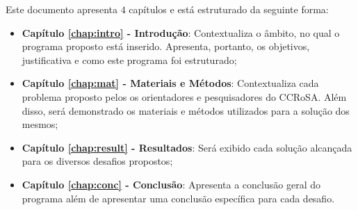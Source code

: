 Este documento apresenta $4$ capítulos e está estruturado da seguinte forma:

\begin{itemize}

  \item \textbf{Capítulo \ref{chap:intro} - Introdução}: Contextualiza o âmbito, no qual o programa proposto está inserido. Apresenta, portanto, os objetivos, justificativa e como este programa foi estruturado;
  \item \textbf{Capítulo \ref{chap:mat} - Materiais e Métodos}: Contextualiza cada problema proposto pelos os orientadores e pesquisadores do CCRoSA. Além disso, será demonstrado os materiais e métodos utilizados para a solução dos mesmos;
  \item \textbf{Capítulo \ref{chap:result} - Resultados}: Será exibido cada solução alcançada para os diversos desafios propostos;
  \item \textbf{Capítulo \ref{chap:conc} - Conclusão}: Apresenta a conclusão geral do programa além de apresentar uma conclusão específica para cada desafio.

\end{itemize}
